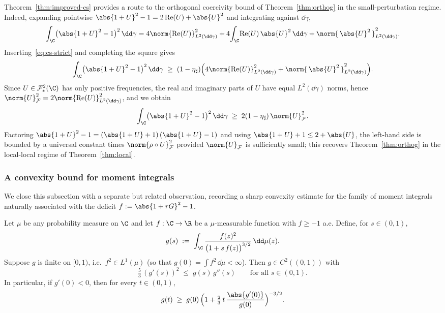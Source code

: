 \begin{remark}\label{rem:cs-implies-orth}
Theorem~\ref{thm:improved-cs} provides a route to the orthogonal
coercivity bound of Theorem~\ref{thm:orthog} in the small-perturbation
regime. Indeed, expanding pointwise
$\abs{1+U}^2 - 1 = 2\operatorname{Re}(U) + \abs{U}^2$
and integrating against $\dd\gamma$,
\[
\int_{\C}\bigl(\abs{1+U}^2-1\bigr)^2\,\dd\gamma
= 4\norm{\operatorname{Re}(U)}_{L^2(\dd\gamma)}^2
+ 4\!\int_{\C}\!\operatorname{Re}(U)\,\abs{U}^2\,\dd\gamma
+ \norm{\,\abs{U}^2\,}_{L^2(\dd\gamma)}^2.
\]
Inserting~\eqref{eq:cs-strict} and completing the square gives
\[
\int_{\C}\bigl(\abs{1+U}^2-1\bigr)^2\,\dd\gamma
\;\ge\;
(1-\eta_\sharp)\Bigl(4\norm{\operatorname{Re}(U)}_{L^2(\dd\gamma)}^2
+ \norm{\,\abs{U}^2\,}_{L^2(\dd\gamma)}^2\Bigr).
\]
Since $U \in \mathcal{F}^2_\ast(\C)$ has only positive frequencies, the
real and imaginary parts of $U$ have equal $L^2(\dd\gamma)$ norms, hence
$\norm{U}_{\mathcal{F}}^2 = 2\norm{\operatorname{Re}(U)}_{L^2(\dd\gamma)}^2$,
and we obtain
\[
\int_{\C}\bigl(\abs{1+U}^2-1\bigr)^2\,\dd\gamma
\;\ge\;
2(1-\eta_\sharp)\,\norm{U}_{\mathcal{F}}^2.
\]
Factoring $\abs{1+U}^2 - 1 = (\abs{1+U}+1)\,(\abs{1+U}-1)$ and using
$\abs{1+U}+1 \le 2 + \abs{U}$, the left-hand side is bounded by a
universal constant times $\norm{\rho \circ U}_{\mathcal{F}}^2$ provided
$\norm{U}_{\mathcal{F}}$ is sufficiently small; this recovers
Theorem~\ref{thm:orthog} in the local-local regime of
Theorem~\ref{thm:local}.
\end{remark}

\subsubsection{A convexity bound for moment integrals}\label{sec:convexity}

We close this subsection with a separate but related observation,
recording a sharp convexity estimate for the family of moment integrals
naturally associated with the deficit $f := \abs{1+rG}^2 - 1$.

\begin{proposition}\label{prop:convexity}
Let $\mu$ be any probability measure on $\C$ and let $f : \C \to \R$ be a
$\mu$-measurable function with $f \ge -1$ a.e. Define, for $s \in (0,1)$,
\[
g(s) \;:=\; \int_{\C} \frac{f(z)^2}{\bigl(1 + s\,f(z)\bigr)^{3/2}}\,
\dd\mu(z).
\]
Suppose $g$ is finite on $[0,1)$, i.e.\ $f^2 \in L^1(\mu)$ (so that
$g(0) = \int f^2\,\dd\mu < \infty$). Then $g \in C^2((0,1))$ with
\begin{equation}\label{eq:diff-ineq}
\tfrac{5}{3}\,(g'(s))^2 \;\le\; g(s)\, g''(s)
\qquad\text{for all } s \in (0,1).
\end{equation}
In particular, if $g'(0) < 0$, then for every $t \in (0,1)$,
\begin{equation}\label{eq:g-lower}
g(t)
\;\ge\;
g(0)\, \Bigl(1 + \tfrac{2}{3}\,t\,\frac{\abs{g'(0)}}{g(0)}\Bigr)^{-3/2}.
\end{equation}
\end{proposition}

